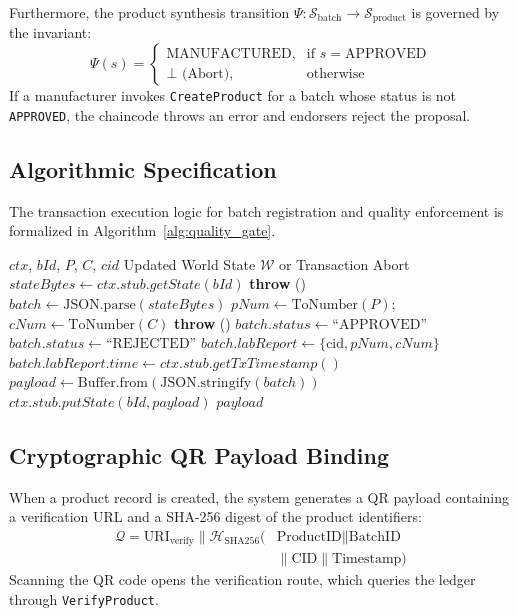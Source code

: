 \documentclass[conference]{IEEEtran}
\begin{document}
Furthermore, the product synthesis transition $\Psi: \mathcal{S}_{\text{batch}} \to \mathcal{S}_{\text{product}}$ is governed by the invariant:
\begin{equation}
    \Psi(s) = \begin{cases}
        \text{MANUFACTURED}, & \text{if } s = \text{APPROVED} \\
        \bot \text{ (Abort)}, & \text{otherwise}
    \end{cases}
    \label{eq:mfr_rule}
\end{equation}
If a manufacturer invokes \texttt{CreateProduct} for a batch whose status is not \texttt{APPROVED}, the chaincode throws an error and endorsers reject the proposal.

\subsection{Algorithmic Specification}
The transaction execution logic for batch registration and quality enforcement is formalized in Algorithm~\ref{alg:quality_gate}.

\begin{algorithm}[htbp]
\caption{Chaincode Deterministic Quality Enforcement}
\label{alg:quality_gate}
\begin{algorithmic}[1]
\REQUIRE $ctx$, $bId$, $P$, $C$, $cid$
\ENSURE Updated World State $\mathcal{W}$ or Transaction Abort
\STATE $stateBytes \gets ctx.stub.getState(bId)$
    \STATE \textbf{throw} ()
\ENDIF
\STATE $batch \gets \text{JSON.parse}(stateBytes)$
\STATE $pNum \gets \text{ToNumber}(P)$;\ \ $cNum \gets \text{ToNumber}(C)$
    \STATE \textbf{throw} ()
\ENDIF
{}
    \STATE $batch.status \gets \text{``APPROVED''}$
\ELSE
    \STATE $batch.status \gets \text{``REJECTED''}$
\ENDIF
\STATE $batch.labReport \gets \{ \text{cid}, pNum, cNum \}$
\STATE $batch.labReport.time \gets ctx.stub.getTxTimestamp()$
\STATE $payload \gets \text{Buffer.from}(\text{JSON.stringify}(batch))$
\STATE $ctx.stub.putState(bId, payload)$
\RETURN $payload$
\end{algorithmic}
\end{algorithm}

\subsection{Cryptographic QR Payload Binding}
When a product record is created, the system generates a QR payload containing a verification URL and a SHA-256 digest of the product identifiers:
\begin{equation}
\begin{split}
    \mathcal{Q} = \text{URI}_{\text{verify}} \parallel \mathcal{H}_{\text{SHA256}}( & \text{ProductID} \parallel \text{BatchID} \\
    & \parallel \text{CID} \parallel \text{Timestamp} )
\end{split}
\end{equation}
Scanning the QR code opens the verification route, which queries the ledger through \texttt{VerifyProduct}.
\end{document}
